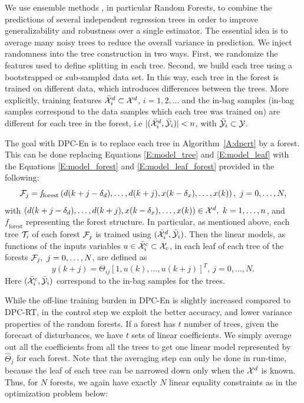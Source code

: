 We use ensemble methods \cite{Friedman2001}, in particular Random Forests, to combine the predictions of several independent regression trees in order to improve generalizability and robustness over a single estimator. 
The essential idea is to average many noisy trees to reduce the overall variance in prediction.
We inject randomness into the tree construction in two ways. First, we randomize the features used to define splitting in each tree.
Second, we build each tree using a bootstrapped or sub-sampled data set.
In this way, each tree in the forest is trained on different data, which introduces differences between the trees.
\textcolor[rgb]{0,0,1}{More explicitly, training features $\bar{\mathcal{X}}^d_i\subset\mathcal{X}^d$, $i=1,2,...$ and the in-bag samples (in-bag samples correspond to the data samples which each tree was trained on) are different for each tree in the forest, i.e $|(\bar {\mathcal{X}}^d_i,\bar{\mathcal{Y}}_i)|<n$, with $\bar{\mathcal{Y}}_i\subset\mathcal{Y}$.}

\textcolor[rgb]{0,0,1}{The goal with DPC-En is to replace each tree in Algorithm~\ref{A:dpcrt} by a forest.
This can be done replacing Equations \eqref{E:model_tree} and \eqref{E:model_leaf} with the Equations \eqref{E:model_forest} and \eqref{E:model_leaf_forest} provided in the following:
\begin{equation}\label{E:model_forest}
\F_j = \mathit{f}_{\mathrm{forest}} \left( d(k+j-\delta_d),\ldots,d(k+j),x(k-\delta_x),\ldots,x(k)  \right),\ j=0,\ldots,N,
\end{equation}
with $\left( d(k+j-\delta_d),\ldots,d(k+j),x(k-\delta_x),\ldots,x(k)  \right)\in\X^d,\ k=1,\ldots,n$, and $\mathit{f}_{\mathrm{forest}}$ representing the forest structure.
In particular, as mentioned above, each tree $\mathcal{T}_i$ of each forest $\mathcal{F}_j$ is trained using $(\bar {\mathcal{X}}^d_i,\bar{\mathcal{Y}}_i)$.
Then the linear models, as functions of the inputs variables $u\in\bar{\mathcal{X}}^c_i\subset\mathcal{X}_c$, in each leaf of each tree of the forests $\F_j,\ j=0,\ldots,N$, are defined as
\begin{equation}\label{E:model_leaf_forest}
y(k+j) =  \Theta_{ij} [1,u(k),\ldots,u(k+j) ]^T,\ j=0,\ldots,N.
\end{equation}
Here $(\bar{\mathcal{X}}^c_i,\bar{\mathcal{Y}}_i)$ correspond to the in-bag samples for the trees.}

While the off-line training burden in DPC-En is slightly increased compared to DPC-RT, in the control step we exploit the better accuracy, and lower variance properties of the random forests. 
If a forest has $t$ number of trees, given the forecast of disturbances, we have $t$ sets of linear coefficients. We simply average out all the coefficients from all the trees to get one linear model represented by $\hat{\Theta}_j$ for each forest. Note that the averaging step can only be done in run-time, because the leaf of each tree can be narrowed down only when the $\mathcal{X}^d$ is known. Thus, for $N$ forests, we again have exactly $N$ linear equality constraints as in the optimization problem below:

